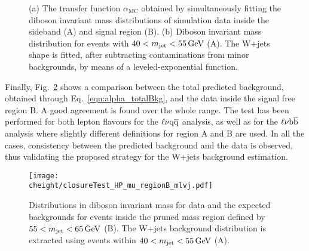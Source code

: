 \begin{figure}[!htb]
\centering
{}
\caption{(a) The transfer function $\alpha_\mathrm{MC}$ obtained by simultaneously fitting the diboson invariant mass distributions of simulation data inside the sideband (A) and signal region (B). (b) Diboson invariant mass distribution for events with $40 < m_{\text{jet}} < 55\,\text{Ge\hspace{-.08em}V}$ (A). The W+jets shape is fitted, after subtracting contaminations from minor backgrounds, by means of a leveled-exponential function.}
\label{fig:mlvjSBandAlpha_closureTest}
\end{figure}

Finally, Fig.~\ref{fig:mlvjSR_closureTest} shows a comparison between the total predicted background, obtained through Eq.~\ref{eqn:alpha_totalBkg}, and the data inside the signal free region B.
A good agreement is found over the whole \mlvj range.
The test has been performed for both lepton flavours for the $\ell\nu\mathrm{q}\overline{\mathrm{q}}$ analysis, as well as for the $\ell\nu{\mathrm{b}\overline{\mathrm{b}}}$ analysis where slightly different definitions for region A and B are used.
In all the cases, consistency between the predicted background and the data is observed, thus validating the proposed strategy for the W+jets background estimation.

\begin{figure}[!htb]
\centering
\texttt{[image: \\cheight/closureTest\_HP\_mu\_regionB\_mlvj.pdf]}
\caption{Distributions in diboson invariant mass for data and the expected backgrounds for events inside the pruned mass region defined by $55 < m_{\text{jet}} < 65\,\text{Ge\hspace{-.08em}V}$ (B). The W+jets background distribution is extracted using events within $40 < m_{\text{jet}} < 55\,\text{Ge\hspace{-.08em}V}$ (A).}
\label{fig:mlvjSR_closureTest}
\end{figure}

